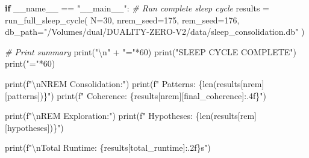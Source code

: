 \documentclass[
]{article}
\newenvironment{Shaded}{}{}
\newcommand{\BuiltInTok}[1]{\textcolor[rgb]{0.00,0.50,0.00}{#1}}
\newcommand{\CharTok}[1]{\textcolor[rgb]{0.25,0.44,0.63}{#1}}
\newcommand{\CommentTok}[1]{\textcolor[rgb]{0.38,0.63,0.69}{\textit{#1}}}
\newcommand{\ControlFlowTok}[1]{\textcolor[rgb]{0.00,0.44,0.13}{\textbf{#1}}}
\newcommand{\DecValTok}[1]{\textcolor[rgb]{0.25,0.63,0.44}{#1}}
\newcommand{\NormalTok}[1]{#1}
\newcommand{\OperatorTok}[1]{\textcolor[rgb]{0.40,0.40,0.40}{#1}}
\newcommand{\SpecialCharTok}[1]{\textcolor[rgb]{0.25,0.44,0.63}{#1}}
\newcommand{\SpecialStringTok}[1]{\textcolor[rgb]{0.73,0.40,0.53}{#1}}
\newcommand{\StringTok}[1]{\textcolor[rgb]{0.25,0.44,0.63}{#1}}
\newcommand{\VariableTok}[1]{\textcolor[rgb]{0.10,0.09,0.49}{#1}}
\begin{document}
\begin{Shaded}
\begin{Highlighting}[]
\ControlFlowTok{if} \VariableTok{\_\_name\_\_} \OperatorTok{==} \StringTok{"\_\_main\_\_"}\NormalTok{:}
    \CommentTok{\# Run complete sleep cycle}
\NormalTok{    results }\OperatorTok{=}\NormalTok{ run\_full\_sleep\_cycle(}
\NormalTok{        N}\OperatorTok{=}\DecValTok{30}\NormalTok{,}
\NormalTok{        nrem\_seed}\OperatorTok{=}\DecValTok{175}\NormalTok{,}
\NormalTok{        rem\_seed}\OperatorTok{=}\DecValTok{176}\NormalTok{,}
\NormalTok{        db\_path}\OperatorTok{=}\StringTok{"/Volumes/dual/DUALITY{-}ZERO{-}V2/data/sleep\_consolidation.db"}
\NormalTok{    )}

    \CommentTok{\# Print summary}
    \BuiltInTok{print}\NormalTok{(}\StringTok{"}\CharTok{\textbackslash{}n}\StringTok{"} \OperatorTok{+} \StringTok{"="}\OperatorTok{*}\DecValTok{60}\NormalTok{)}
    \BuiltInTok{print}\NormalTok{(}\StringTok{"SLEEP CYCLE COMPLETE"}\NormalTok{)}
    \BuiltInTok{print}\NormalTok{(}\StringTok{"="}\OperatorTok{*}\DecValTok{60}\NormalTok{)}

    \BuiltInTok{print}\NormalTok{(}\SpecialStringTok{f"}\CharTok{\textbackslash{}n}\SpecialStringTok{NREM Consolidation:"}\NormalTok{)}
    \BuiltInTok{print}\NormalTok{(}\SpecialStringTok{f"  Patterns: }\SpecialCharTok{\{}\BuiltInTok{len}\NormalTok{(results[}\StringTok{\textquotesingle{}nrem\textquotesingle{}}\NormalTok{][}\StringTok{\textquotesingle{}patterns\textquotesingle{}}\NormalTok{])}\SpecialCharTok{\}}\SpecialStringTok{"}\NormalTok{)}
    \BuiltInTok{print}\NormalTok{(}\SpecialStringTok{f"  Coherence: }\SpecialCharTok{\{}\NormalTok{results[}\StringTok{\textquotesingle{}nrem\textquotesingle{}}\NormalTok{][}\StringTok{\textquotesingle{}final\_coherence\textquotesingle{}}\NormalTok{]}\SpecialCharTok{:.4f\}}\SpecialStringTok{"}\NormalTok{)}

    \BuiltInTok{print}\NormalTok{(}\SpecialStringTok{f"}\CharTok{\textbackslash{}n}\SpecialStringTok{REM Exploration:"}\NormalTok{)}
    \BuiltInTok{print}\NormalTok{(}\SpecialStringTok{f"  Hypotheses: }\SpecialCharTok{\{}\BuiltInTok{len}\NormalTok{(results[}\StringTok{\textquotesingle{}rem\textquotesingle{}}\NormalTok{][}\StringTok{\textquotesingle{}hypotheses\textquotesingle{}}\NormalTok{])}\SpecialCharTok{\}}\SpecialStringTok{"}\NormalTok{)}

    \BuiltInTok{print}\NormalTok{(}\SpecialStringTok{f"}\CharTok{\textbackslash{}n}\SpecialStringTok{Total Runtime: }\SpecialCharTok{\{}\NormalTok{results[}\StringTok{\textquotesingle{}total\_runtime\textquotesingle{}}\NormalTok{]}\SpecialCharTok{:.2f\}}\SpecialStringTok{s"}\NormalTok{)}


\end{Highlighting}
\end{Shaded}
\end{document}
